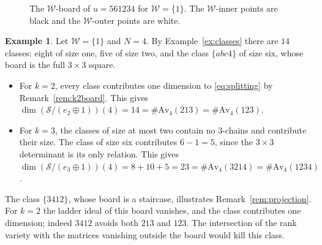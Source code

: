 \documentclass[11pt]{amsart}
\theoremstyle{definition}
\newtheorem{example}[theorem]{Example}
\theoremstyle{remark}
\newcommand{\cS}{\mathscr{S}}
\newcommand{\cW}{\mathcal{W}}
\newcommand{\Av}{\mathrm{Av}}
\newcommand{\gridlines}[2]{\draw[gray!55,very thin] (0,0) grid (#1,-#2);}
\newcommand{\shaderows}[2][gray!22]{\foreach \x/\y in {#2}{\fill[#1] (0,1-\x) rectangle (\y,-\x);}}
\newcommand{\pt}[2]{\fill (#2-0.5,0.5-#1) circle (0.16);}
\newcommand{\opt}[2]{\draw[semithick,fill=white] (#2-0.5,0.5-#1) circle (0.16);}
\begin{document}
\begin{figure}[ht]
\centering
{}
\caption{The $\cW$-board of $u=561234$ for $\cW=\{1\}$. The $\cW$-inner points are black and the $\cW$-outer points are white.}\label{fig:tau1}
\end{figure}

\begin{example}\label{ex:tau1count}
Let $\cW=\{1\}$ and $N=4$. By Example~\ref{ex:classes} there are $14$ classes: eight of size one, five of size two, and the class $\{abc4\}$ of size six, whose board is the full $3\times3$ square.
\begin{itemize}
\item For $k=2$, every class contributes one dimension to \eqref{eq:splitting} by Remark~\ref{rem:k2board}. This gives $\dim(\cS/(e_2\oplus1))(4)=14=\#\Av_4(213)=\#\Av_4(123)$.
\item For $k=3$, the classes of size at most two contain no $3$-chains and contribute their size. The class of size six contributes $6-1=5$, since the $3\times3$ determinant is its only relation. This gives $\dim(\cS/(e_3\oplus1))(4)=8+10+5=23=\#\Av_4(3214)=\#\Av_4(1234)$.
\end{itemize}
The class $\{3412\}$, whose board is a staircase, illustrates Remark~\ref{rem:projection}. For $k=2$ the ladder ideal of this board vanishes, and the class contributes one dimension; indeed $3412$ avoids both $213$ and $123$. The intersection of the rank variety with the matrices vanishing outside the board would kill this class.
\end{example}
\end{document}
